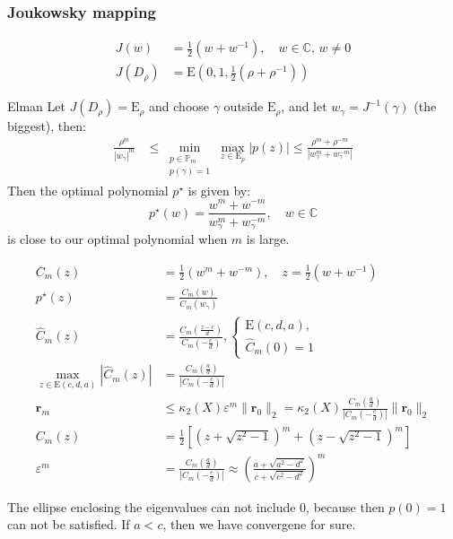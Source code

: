 \subsubsection{Joukowsky mapping}
\begin{align*}
    J(w)      & = \frac{1}{2}(w + w^{-1}), \quad w \in \mathbb{C}, \, w \neq 0 \\
    J(D_\rho) & = \mathrm{E}(0,1, \frac12(\rho + \rho^{-1}))
\end{align*}
\begin{theorem}{Elman}{}
    Let $J(D_\rho) = \mathrm{E}_\rho$ and choose $\gamma$ outside $\mathrm{E}_\rho$, and let  $ w_\gamma = J^{-1}(\gamma)$ (the biggest), then:
    \begin{align*}
        \frac{\rho^m}{|w_\gamma|^m} & \leq \min_{\substack{p \in \mathbb{P}_m \\ p(\gamma) = 1}} \max_{z \in \mathrm{E}_\rho} |p(z)| \leq \frac{\rho^m + \rho^{-m}}{|w_\gamma^m + w_\gamma^{-m}|}
    \end{align*}
    Then the optimal polynomial $p^\star$ is given by:
    \[
        p^\star(w) = \frac{w^m + w^{-m}}{w_\gamma^m + w_\gamma^{-m}}, \quad w \in \mathbb{C}
    \]
    is close to our optimal polynomial when $m$ is large.
\end{theorem}

\begin{align*}
    C_m(z)                                        & = \frac{1}{2}(w^m + w^{-m}), \quad z = \frac{1}{2}(w + w^{-1})                                                          \\
    p^\star(z)                                    & = \frac{C_m(w)}{C_m(w_\gamma)}                                                                                          \\
    \hat{C}_m(z)                                  & = \frac{C_m(\frac{z - c}{d})}{C_m(-\frac{c}{d})},
    \begin{cases}
        \mathrm{E}(c,d,a), \\
        \hat{C}_m(0) = 1
    \end{cases}                                                                                                                                   \\
    \max_{z \in \mathrm{E}(c,d,a)} |\hat{C}_m(z)| & = \frac{C_m(\frac{a}{d})}{|C_m(-\frac{c}{d})|}                                                                          \\
    \mathbf{r}_m                                  & \leq \kappa_2(X) \varepsilon^{m} \|\mathbf{r}_0\|_2 = \kappa_2(X) \frac{C_m(\frac{a}{d})}{|C_m(-\frac{c}{d})|} \|\mathbf{r}_0\|_2                                           \\
    C_m(z)                                        & = \frac{1}{2}\left[\left(z + \sqrt{z^2 - 1}\right)^m + \left(z - \sqrt{z^2 - 1}\right)^m\right]                         \\
    \varepsilon^m                                 & = \frac{C_m(\frac{a}{d})}{|C_m(-\frac{c}{d})|} \approx \left(\frac{a + \sqrt{a^2 - d^2}}{c + \sqrt{c^2 - d^2}}\right)^m
\end{align*}

The ellipse enclosing the eigenvalues can not include $0$, because then $p(0) = 1$ can not be satisfied.
If $a < c$, then we have convergene for sure.

